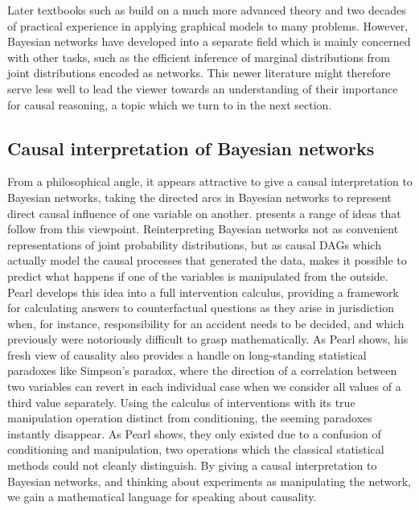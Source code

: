 Later textbooks such as \cite{koller_friedman_2009} build on a much more advanced theory and two decades of practical experience in applying graphical models to many problems. However, Bayesian networks have developed into a separate field which is mainly concerned with other tasks, such as the efficient inference of marginal distributions from joint distributions encoded as networks. This newer literature might therefore serve less well to lead the viewer towards an understanding of their importance for causal reasoning, a topic which we turn to in the next section.

\subsection{Causal interpretation of {B}ayesian networks}
From a philosophical angle, it appears attractive to give a causal interpretation to Bayesian networks, taking the directed arcs in Bayesian networks to represent direct causal influence of one variable on another. \cite{pearl2009} presents a range of ideas that follow from this viewpoint. Reinterpreting Bayesian networks not as convenient representations of joint probability distributions, but as causal DAGs which actually model the causal processes that generated the data, makes it possible to predict what happens if one of the variables is manipulated from the outside. Pearl develops this idea into a full intervention calculus, providing a framework for calculating answers to counterfactual questions as they arise in jurisdiction when, for instance, responsibility for an accident needs to be decided, and which previously were notoriously difficult to grasp mathematically. As Pearl shows, his fresh view of causality also provides a handle on long-standing statistical paradoxes like Simpson's paradox, where the direction of a correlation between two variables can revert in each individual case when we consider all values of a third value separately. Using the calculus of interventions with its true manipulation operation distinct from conditioning, the seeming paradoxes instantly disappear. As Pearl shows, they only existed due to a confusion of conditioning and manipulation, two operations which the classical statistical methods could not cleanly distinguish. By giving a causal interpretation to Bayesian networks, and thinking about experiments as manipulating the network, we gain a mathematical language for speaking about causality.

